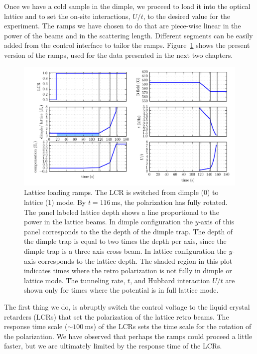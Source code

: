 Once we have a cold sample in the dimple, we proceed to load it into the
optical lattice and to set the on-site interactions, $U/t$, to the desired
value for the experiment.  The ramps we have chosen to do that are piece-wise
linear in the power of the beams and in the scattering length.  Different
segments can be easily added from the control interface to tailor the ramps.
Figure~\ref{fig:lattice-load} shows the present version of the ramps, used for
the data presented in the next two chapters. 
\begin{figure}
    \centering
\includegraphics[width=\textwidth]{../figures/evap/load_ramp.png}
\caption{\small Lattice loading ramps.  The LCR is switched from dimple (0) to
lattice (1) mode.  By $t=116\,$ms, the polarization has fully rotated.   The
panel labeled lattice depth shows a line proportional to the power in the
lattice beams.  In dimple configuration the $y$-axis of this panel corresponds
to the the depth of the dimple trap. The depth of the dimple trap is equal to
two times the depth per axis, since the dimple trap is a three axis cross beam.
In lattice configuration the $y$-axis corresponds to the lattice depth.  The
shaded region in this plot indicates times where the retro polarization is not
fully in dimple or lattice mode.  The tunneling rate, $t$, and Hubbard
interaction $U/t$ are shown only for times where the potential is in full
lattice mode.    }
\label{fig:lattice-load}
\end{figure}

The first thing we do, is abruptly switch the control voltage to the liquid
crystal retarders (LCRs) that set the polarization of the lattice retro beams.
The response time scale ($\sim100~$ms) of the LCRs sets the time scale for the
rotation of the polarization.   We have observed that perhaps the ramps could
proceed a little faster, but we are ultimately limited by the response time of
the LCRs.

